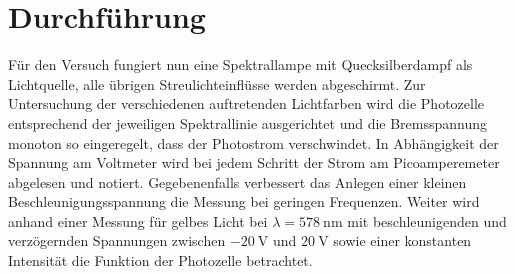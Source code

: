 \section{Durchführung}
\label{sec:durchführung}

Für den Versuch fungiert nun eine Spektrallampe mit Quecksilberdampf als Lichtquelle, alle übrigen Streulichteinflüsse werden abgeschirmt.
Zur Untersuchung der verschiedenen auftretenden Lichtfarben wird die Photozelle entsprechend der jeweiligen Spektrallinie ausgerichtet
und die Bremsspannung monoton so eingeregelt, dass der Photostrom verschwindet. In Abhängigkeit der Spannung am Voltmeter wird bei jedem
Schritt der Strom am Picoamperemeter abgelesen und notiert. Gegebenenfalls verbessert das Anlegen einer kleinen Beschleunigungsspannung
die Messung bei geringen Frequenzen. Weiter wird anhand einer Messung für gelbes Licht bei $\lambda = \qty{578}{\nano\meter}$ mit
beschleunigenden und verzögernden Spannungen zwischen $\qty{-20}{\volt}$ und $\qty{20}{\volt}$ sowie einer konstanten Intensität
die Funktion der Photozelle betrachtet.

